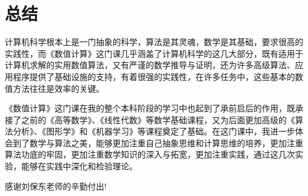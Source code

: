 \section{总结}

计算机科学根本上是一门抽象的科学，算法是其灵魂，数学是其基础，要求很高的实践性，而《数值计算》这门课几乎涵盖了计算机科学的这几大部分，既有适用于计算机求解的实用数值算法，又有严谨的数学推导与证明，还为许多高级算法、应用程序提供了基础设施的支持，有着很强的实践性，在许多任务中，这些基本的数值方法往往是效率的关键。

《数值计算》这门课在我的整个本科阶段的学习中也起到了承前启后的作用，既承接了之前的《高等数学》、《线性代数》等数学基础课程，又为后面更加高级的《算法分析》、《图形学》和《机器学习》等课程奠定了基础。在这门课中，我进一步体会到了数学与算法之美，能够更加注重自己抽象思维和计算思维的培养，更加注重算法功底的牢固，更加注重数学知识的深入与拓宽，更加注重实践，通过这几次实验，能够在实践中深化和检验理论。

感谢刘保东老师的辛勤付出!